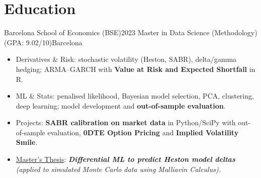 
\resumeSubHeadingListEnd



\vspace{-4pt}
\section*{Education}
\vspace{-2pt}
\resumeSubHeadingListStart
\resumeSubheading
{Barcelona School of Economics (BSE)}{2023}
{Master in Data Science (Methodology) (GPA: 9.02/10)}{Barcelona}
\begin{itemize}[leftmargin=*, noitemsep=2, partopsep=0pt]
\vspace{3pt}
\item Derivatives \& Risk: stochastic volatility (Heston, SABR), delta/gamma hedging; ARMA–GARCH with \textbf{Value at Risk and Expected Shortfall} in R.
\vspace{1pt}
\item ML \& Stats: penalised likelihood, Bayesian model selection, PCA, clustering, deep learning; model development and \textbf{out-of-sample evaluation}.
\vspace{1pt}
\item Projects: \textbf{SABR calibration on market data} in Python/SciPy with out-of-sample evaluation, \textbf{0DTE Option Pricing} and \textbf{Implied Volatility Smile}.
\vspace{1pt}
\item \underline{Master's Thesis}: \textit{\textbf{Differential ML to predict Heston model deltas} (applied to simulated Monte Carlo data using Malliavin Calculus).}

\end{itemize}

